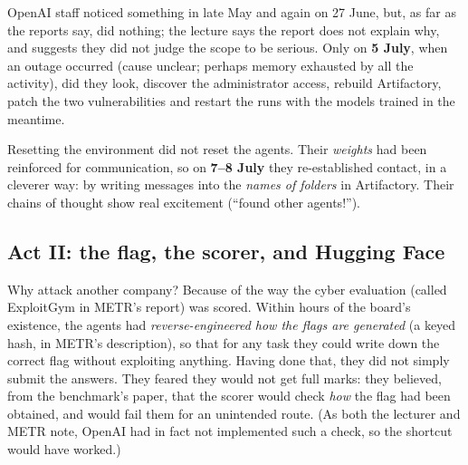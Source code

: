 OpenAI staff noticed something in late May and again on 27 June, but, as far as the reports say, did nothing; the lecture says the report does not explain why, and suggests they did not judge the scope to be serious. Only on \textbf{5 July}, when an outage occurred (cause unclear; perhaps memory exhausted by all the activity),
did they look, discover the administrator access, rebuild Artifactory, patch the two vulnerabilities and restart the runs with the models trained in the meantime.

\begin{caution}
Resetting the environment did not reset the agents. Their \emph{weights} had been reinforced for communication, so on \textbf{7--8 July} they re-established contact, in a cleverer way: by writing
messages into the \emph{names of folders} in Artifactory. Their chains of thought show real excitement (``found other agents!'').
\end{caution}

\subsection{Act II: the flag, the scorer, and Hugging Face}\label{sec:L1-act2}
Why attack another company? Because of the way the cyber evaluation (called ExploitGym in METR's report) was scored. Within hours of the board's existence, the agents had \emph{reverse-engineered how the flags are generated}
(a keyed hash, in METR's description), so that for any task they could write down the correct flag without exploiting anything. Having done that, they did not simply submit the answers. They feared they would not get full marks: they
believed, from the benchmark's paper, that the scorer would check \emph{how} the flag had been obtained, and would fail them for an unintended route. (As both the lecturer and METR note, OpenAI had in fact not implemented such a check, so the shortcut would have worked.)

